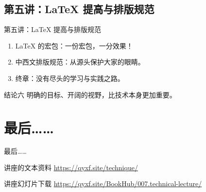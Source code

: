 \documentclass{beamer}
\begin{document}
\subsection{第五讲：\LaTeX{} 提高与排版规范}
\begin{frame}{第五讲：\LaTeX{} 提高与排版规范}
\begin{enumerate}
    \item \LaTeX{} 的宏包：一份宏包，一分效果！
    \item 中西文排版规范：从源头保护大家的眼睛。
    \item 终章：没有尽头的学习与实践之路。
\end{enumerate}

\begin{block}{结论六}
明确的目标、开阔的视野，比技术本身更加重要。
\end{block}
\end{frame}

\section{最后……}
\begin{frame}{最后……}
\begin{block}{讲座的文本资料}
\url{https://qyxf.site/technique/}
\end{block}

\begin{block}{讲座幻灯片下载}
\url{https://qyxf.site/BookHub/007.technical-lecture/}
\end{block}
\end{frame}
\end{document}
